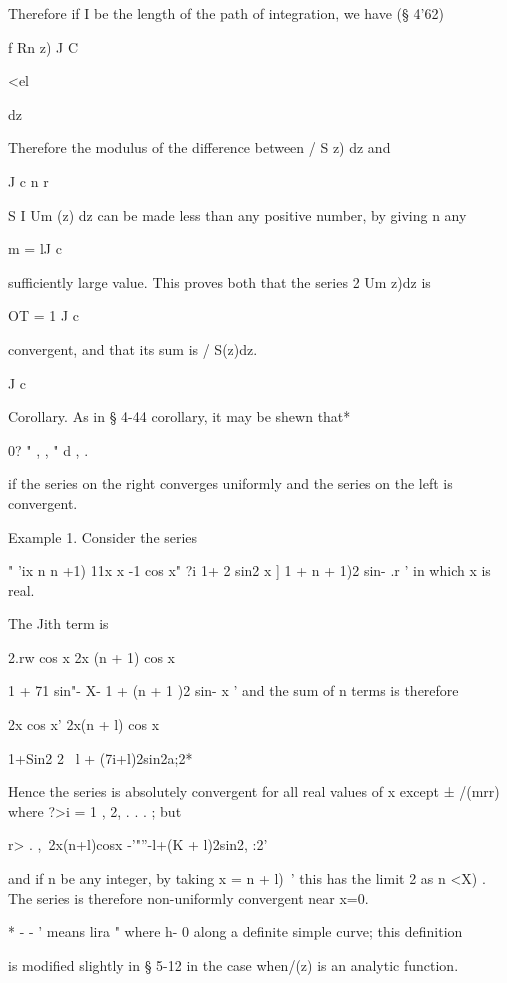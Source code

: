 Therefore if I be the length of the path of integration, we have (§
4'62)



f Rn z) J C



<el



dz

Therefore the modulus of the difference between / S z) dz and

J c n r

S I Um (z) dz can be made less than any positive number, by giving n
any

m = lJ c

sufficiently large value. This proves both that the series 2 Um z)dz
is

OT = 1 J c

convergent, and that its sum is / S(z)dz.

J c

Corollary. As in § 4-44 corollary, it may be shewn that*

0? " , , " d , .

if the series on the right converges uniformly and the series on the
left is convergent.

Example 1. Consider the series

" 'ix n n +1) 11x x -1 cos x" ?i 1+ 2 sin2 x ] 1 + n + 1)2 sin- .r '
in which x is real.

The Jith term is

2.rw cos x 2x (n + 1) cos x



1 + 71 sin"- X- 1 + (n + 1 )2 sin- x ' and the sum of n terms is
therefore

2x cos x' 2x(n + l) cos x

1+Sin2 2~ l + (7i+l)2sin2a;2*

Hence the series is absolutely convergent for all real values of x
except ± /(mrr) where ?>i = 1 , 2, . . . ; but

r> . ,\ 2x(n+l)cosx -'"''-l+(K + l)2sin2, :2'

and if n be any integer, by taking x = n + l)~' this has the limit 2
as n <X) . The series is therefore non-uniformly convergent near x=0.

* - - ' means lira " where h- 0 along a definite simple curve; this
definition

is modified slightly in § 5-12 in the case when/(z) is an analytic
function.



